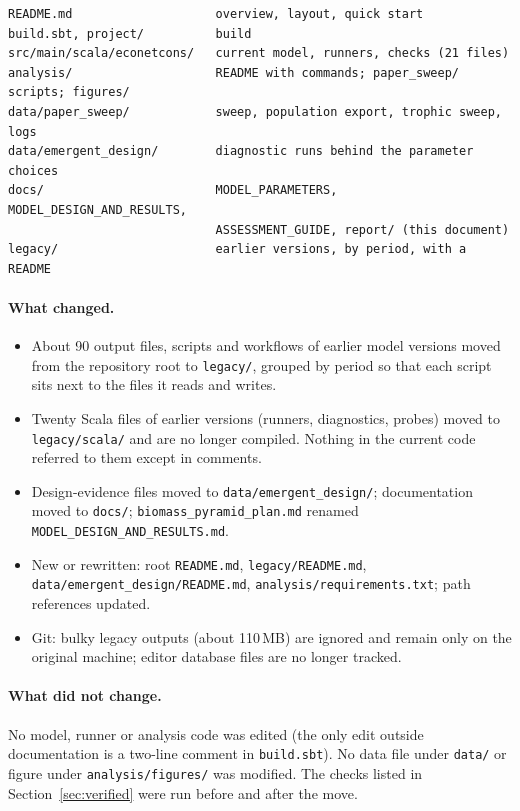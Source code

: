 \documentclass[11pt,a4paper]{article}
\newcommand{\code}[1]{\texttt{\small #1}}
\begin{document}
\begin{verbatim}
README.md                    overview, layout, quick start
build.sbt, project/          build
src/main/scala/econetcons/   current model, runners, checks (21 files)
analysis/                    README with commands; paper_sweep/ scripts; figures/
data/paper_sweep/            sweep, population export, trophic sweep, logs
data/emergent_design/        diagnostic runs behind the parameter choices
docs/                        MODEL_PARAMETERS, MODEL_DESIGN_AND_RESULTS,
                             ASSESSMENT_GUIDE, report/ (this document)
legacy/                      earlier versions, by period, with a README
\end{verbatim}

\paragraph{What changed.}
\begin{itemize}
\item About 90 output files, scripts and workflows of earlier model versions moved from the repository
root to \code{legacy/}, grouped by period so that each script sits next to the files it reads and writes.
\item Twenty Scala files of earlier versions (runners, diagnostics, probes) moved to \code{legacy/scala/}
and are no longer compiled. Nothing in the current code referred to them except in comments.
\item Design-evidence files moved to \code{data/emergent\_design/}; documentation moved to \code{docs/};
\code{biomass\_pyramid\_plan.md} renamed \code{MODEL\_DESIGN\_AND\_RESULTS.md}.
\item New or rewritten: root \code{README.md}, \code{legacy/README.md},
\code{data/emergent\_design/README.md}, \code{analysis/requirements.txt}; path references updated.
\item Git: bulky legacy outputs (about 110\,MB) are ignored and remain only on the original machine; editor
database files are no longer tracked.
\end{itemize}

\paragraph{What did not change.} No model, runner or analysis code was edited (the only edit outside
documentation is a two-line comment in \code{build.sbt}). No data file under \code{data/} or figure under
\code{analysis/figures/} was modified. The checks listed in Section~\ref{sec:verified} were run before and
after the move.
\end{document}
